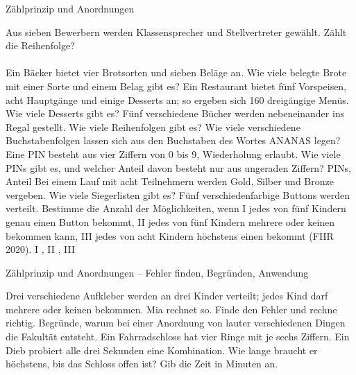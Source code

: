 \setcounter{aufgabe}{7}

\begin{aufgabe}{Zählprinzip und Anordnungen}
\begin{teile}
\teil Aus sieben Bewerbern werden Klassensprecher und Stellvertreter gewählt. Zählt die Reihenfolge? \\  \\ 
\teil Ein Bäcker bietet vier Brotsorten und sieben Beläge an. Wie viele belegte Brote mit einer Sorte und einem Belag gibt es? \leerfeld
\teil Ein Restaurant bietet fünf Vorspeisen, acht Hauptgänge und einige Desserts an; so ergeben sich 160 dreigängige Menüs. Wie viele Desserts gibt es? \leerfeld
\teil Fünf verschiedene Bücher werden nebeneinander ins Regal gestellt. Wie viele Reihenfolgen gibt es? \leerfeld
\teil Wie viele verschiedene Buchstabenfolgen lassen sich aus den Buchstaben des Wortes ANANAS legen? \leerfeld
\teil Eine PIN besteht aus vier Ziffern von 0 bis 9, Wiederholung erlaubt. Wie viele PINs gibt es, und welcher Anteil davon besteht nur aus ungeraden Ziffern? \leerfeld PINs, Anteil \leerfeld
\teil Bei einem Lauf mit acht Teilnehmern werden Gold, Silber und Bronze vergeben. Wie viele Siegerlisten gibt es? \leerfeld
\teil Fünf verschiedenfarbige Buttons werden verteilt. Bestimme die Anzahl der Möglichkeiten, wenn I jedes von fünf Kindern genau einen Button bekommt, II jedes von fünf Kindern mehrere oder keinen bekommen kann, III jedes von acht Kindern höchstens einen bekommt \hfill (FHR 2020). I \leerfeld , II \leerfeld , III \leerfeld
\end{teile}
\end{aufgabe}

\begin{aufgabe}{Zählprinzip und Anordnungen – Fehler finden, Begründen, Anwendung}
\begin{teile}
\teil Drei verschiedene Aufkleber werden an drei Kinder verteilt; jedes Kind darf mehrere oder keinen bekommen. Mia rechnet so. Finde den Fehler und rechne richtig. 
\teil Begründe, warum bei einer Anordnung von lauter verschiedenen Dingen die Fakultät entsteht.
\teil Ein Fahrradschloss hat vier Ringe mit je sechs Ziffern. Ein Dieb probiert alle drei Sekunden eine Kombination. Wie lange braucht er höchstens, bis das Schloss offen ist? Gib die Zeit in Minuten an. \leerfeld[min]
\end{teile}
\end{aufgabe}
